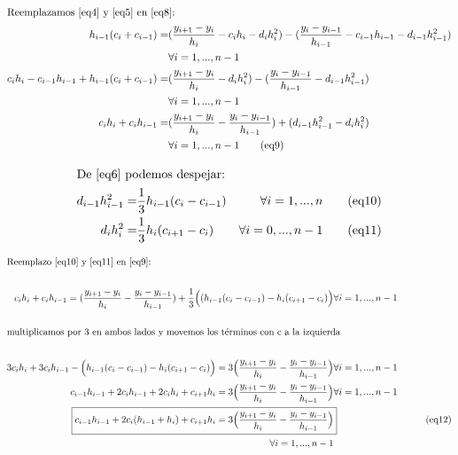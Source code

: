 \begin{align*}
\intertext{Reemplazamos \eqref{eq4} y \eqref{eq5} en \eqref{eq8}: } 
h_{i-1}(c_i+c_{i-1}) =  & (\frac{y_{i+1}-y_{i}}{h_{i}} - c_{i}h_{i} - d_{i}h_{i}^2) - (\frac{y_i-y_{i-1}}{h_{i-1}} - c_{i-1}h_{i-1} - d_{i-1}h_{i-1}^2)  \\
&   \forall i= 1, ..., n-1 \\
c_{i}h_{i} - c_{i-1}h_{i-1} + h_{i-1}(c_i+c_{i-1}) =  & (\frac{y_{i+1}-y_{i}}{h_{i}} - d_{i}h_{i}^2) - 
(\frac{y_i-y_{i-1}}{h_{i-1}} - d_{i-1}h_{i-1}^2) \\
&   \forall i= 1, ..., n-1  \\
c_{i}h_{i} +  c_ih_{i-1} =  & (\frac{y_{i+1}-y_{i}}{h_{i}} -  \frac{y_i-y_{i-1}}{h_{i-1}}) + (d_{i-1}h_{i-1}^2  - d_{i}h_{i}^2) \\
&   \forall i= 1, ..., n-1 \tag{eq9} \label{eq9} 
\end{align*}

\begin{align*}
\intertext{De \eqref{eq6} podemos despejar: }
d_{i-1}h_{i-1}^2 = & \frac{1}{3}h_{i-1}(c_i-c_{i-1}) & \forall i= 1, ..., n \tag{eq10} \label{eq10}\\
d_{i}h_{i}^2 = & \frac{1}{3}h_{i}(c_{i+1}-c_{i}) & \forall i= 0, ..., n-1 \tag{eq11} \label{eq11}\\
\end{align*}

\begin{align*}
\intertext{Reemplazo \eqref{eq10} y \eqref{eq11} en \eqref{eq9}:} 
\intertext{}
c_{i}h_{i} +  c_ih_{i-1} = (\frac{y_{i+1}-y_{i}}{h_{i}}  -\frac{y_i-y_{i-1}}{h_{i-1}}) + \frac{1}{3}\Big((h_{i-1}(c_i-c_{i-1})  - h_{i}(c_{i+1}-c_{i})\Big) & \forall i= 1, ..., n-1 \\
\intertext{}
\intertext{multiplicamos por 3 en ambos lados y movemos los términos con c a la izquierda}
\intertext{}
3c_{i}h_{i} +  3c_ih_{i-1} - \Big(h_{i-1}(c_i-c_{i-1})  - h_{i}(c_{i+1}-c_{i})\Big) =  3\Big(\frac{y_{i+1}-y_{i}}{h_{i}}  -\frac{y_i-y_{i-1}}{h_{i-1}}\Big) & \forall i= 1, ..., n-1 \\
c_{i-1}h_{i-1} + 2c_ih_{i-1} + 2c_ih_i + c_{i+1}h_i =  3\Big(\frac{y_{i+1}-y_{i}}{h_{i}} - \frac{y_i-y_{i-1}}{h_{i-1}}\Big)  & \forall i= 1, ..., n-1 \\
\Aboxed{c_{i-1}h_{i-1} + 2c_i(h_{i-1} + h_i) + c_{i+1}h_i =  3\Big(\frac{y_{i+1}-y_{i}}{h_{i}}  -\frac{y_i-y_{i-1}}{h_{i-1}}\Big)} &  \tag{eq12} \label{eq12} \\
\forall i= 1, ..., n-1
\end{align*}

